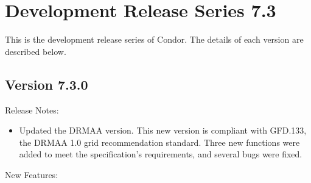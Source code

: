 
\section{\label{sec:History-7-3}Development Release Series 7.3}

This is the development release series of Condor.
The details of each version are described below.


\subsection*{\label{sec:New-7-3-0}Version 7.3.0}

\noindent Release Notes:

\begin{itemize}

\item Updated the DRMAA version.
This new version is compliant with GFD.133,
the DRMAA 1.0 grid recommendation standard.
Three new functions were added to meet the specification's requirements,
and several bugs were fixed.

\end{itemize}


\noindent New Features:

